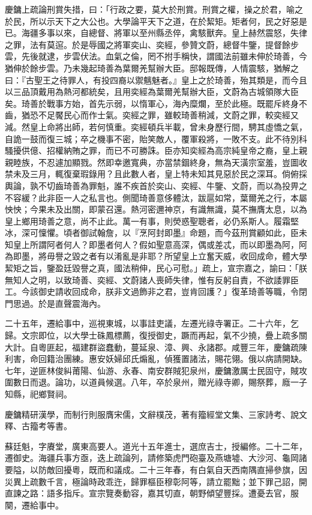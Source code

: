 \begin{pinyinscope}
慶鏞上疏論刑賞失措，曰：「行政之要，莫大於刑賞。刑賞之權，操之於君，喻之於民，所以示天下之大公也。大學論平天下之道，在於絜矩。矩者何，民之好惡是已。海疆多事以來，自總督、將軍以至州縣丞倅，禽駭獸奔。皇上赫然震怒，失律之罪，法有莫逭。於是辱國之將軍奕山、奕經，參贊文蔚，總督牛鑒，提督餘步雲，先後就逮，步雲伏法。血氣之倫，罔不拊手稱快，謂國法前雖未伸於琦善，今猶伸於餘步雲。乃未幾起琦善為葉爾羌幫辦大臣。邸報既傳，人情震駭，猶解之曰：『古聖王之待罪人，有投四裔以禦魑魅者。』皇上之於琦善，殆其類是，而今且以三品頂戴用為熱河都統矣，且用奕經為葉爾羌幫辦大臣，文蔚為古城領隊大臣矣。琦善於戰事方始，首先示弱，以惰軍心，海內糜爛，至於此極。既罷斥終身不齒，猶恐不足饜民心而作士氣。奕經之罪，雖較琦善稍減，文蔚之罪，較奕經又減。然皇上命將出師，若何慎重。奕經頓兵半載，曾未身歷行間，騁其虛憍之氣，自詭一鼓而復三城；卒之機事不密，貽笑敵人，覆軍殺將，一敗不支。此不待別科騷擾供億、招權納賄之罪，而已不可勝誅。臣亦知奕經為高宗純皇帝之裔，皇上親親睦族，不忍遽加顯戮。然即幸邀寬典，亦當禁錮終身，無為天潢宗室羞，豈圖收禁未及三月，輒復棄瑕錄用？且此數人者，皇上特未知其見惡於民之深耳。倘俯採輿論，孰不切齒琦善為罪魁，誰不疾首於奕山、奕經、牛鑒、文蔚，而以為投畀之不容緩？此非臣一人之私言也。側聞琦善意侈體汰，跋扈如常，葉爾羌之行，本屬怏怏；今果未及出關，即蒙召還。熱河密邇神京，有識無識，莫不撫膺太息，以為皇上鄉用琦善之意，尚不止此。萬一有事，則熒惑聖聰者，必仍系斯人。履霜堅冰，深可懍懼。頃者御試翰詹，以『烹阿封即墨』命題，而今茲刑賞顧如此，臣未知皇上所謂阿者何人？即墨者何人？假如聖意高深，偶或差忒，而以即墨為阿，阿為即墨，將毋譽之毀之者有以淆亂是非耶？所望皇上立奮天威，收回成命，體大學絜矩之旨，鑒盈廷毀譽之真，國法稍伸，民心可慰。」疏上，宣宗嘉之，諭曰：「朕無知人之明，以致琦善、奕經、文蔚諸人喪師失律，惟有反躬自責，不欲諉罪臣工。今該御史請收回成命，朕非文過飾非之君，豈肯回護？」復革琦善等職，令閉門思過。於是直聲震海內。

二十五年，遷給事中，巡視東城，以事詿吏議，左遷光祿寺署正。二十六年，乞歸。文宗即位，以大學士硃鳳標薦，復授御史，蹶而再起，氣不少撓，疊上疏多關大計。自粵匪起，福建群盜蠢動，蔓延泉、漳、興、永諸郡。咸豐三年，慶鏞疏陳利害，命回籍治團練。惠安妖婦邱氏煽亂，偵獲置諸法，賜花翎。俄以病請開缺。七年，逆匪林俊糾莆陽、仙游、永春、南安群賊犯泉州，慶鏞激厲士民固守，賊攻圍數日而退。論功，以道員候選。八年，卒於泉州，贈光祿寺卿，賜祭葬，廕一子知縣，祀鄉賢祠。

慶鏞精研漢學，而制行則服膺宋儒，文辭樸茂，著有籀經堂文集、三家詩考、說文釋、古籀考等書。

蘇廷魁，字賡堂，廣東高要人。道光十五年進士，選庶吉士，授編修。二十二年，遷御史。海疆兵事方亟，迭上疏論列，請修築虎門砲臺及燕塘墟、大沙河、龜岡諸要隘，以防敵回擾粵，既而和議成。二十三年春，有白氣自天西南隅直掃參旗，因災異上疏數千言，極論時政乖迕，歸罪樞臣穆彰阿等，請立罷黜；並下罪己詔，開直諫之路：語多指斥。宣宗覽奏動容，嘉其切直，朝野傾望豐採。遭憂去官，服闋，遷給事中。


\end{pinyinscope}
